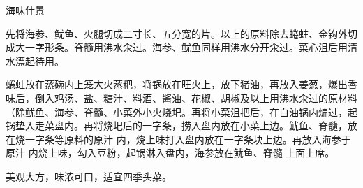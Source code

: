 \begin{recipe}{海味什景}

\ingredients


\cooking

\step 先将海参、鱿鱼、火腿切成二寸长、五分宽的片。以上的原料除去蜷蛀、金钩外切成大一字形条。脊髓用沸水汆过。海参、鱿鱼同样用沸水分开汆过。菜心沮后用清水漂起待用。

\step 蜷蛀放在蒸碗内上笼大火蒸粑，将锅放在旺火上，放下猪油，再放入姜葱，爆出香味后，倒入鸡汤、盐、糖汁、料酒、酱油、花椒、胡椒及以上用沸水汆过的原材料（除鱿鱼、海参、脊髓、小菜外小火烧圯。再将小菜沮把后，在白油锅内煸过，起锅垫入走菜盘内。再将烧圯后的一字条，捞入盘内放在小菜上边。鱿鱼、脊髓，放在烧一字条等原料的原汁
内，烧上味打入盘内放在一字条块上边。再放入海参于原汁 内烧上味，勾入豆粉，起锅淋入盘内，海参放在鱿鱼、脊髓 上面上席。

\notes

美观大方，味浓可口，适宜四季头菜。

\end{recipe}


